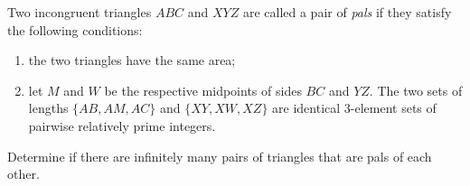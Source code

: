 Two incongruent triangles $ABC$ and $XYZ$ are called a pair of \emph{pals} if they satisfy the following conditions: 
\begin{enumerate}[label=(\alph*)]
	\item the two triangles have the same area;
	\item let $M$ and $W$ be the respective midpoints of sides $BC$ and $YZ$.  The two sets of lengths $\{AB, AM, AC\}$ and $\{XY, XW, XZ\}$ are identical $3$-element sets of pairwise relatively prime integers.
\end{enumerate}
Determine if there are infinitely many pairs of triangles that are pals of each other.